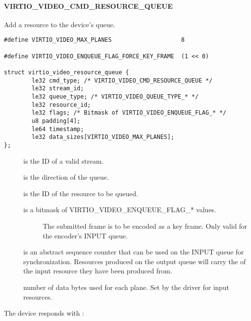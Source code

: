 \paragraph{VIRTIO_VIDEO_CMD_RESOURCE_QUEUE}\label{sec:Device Types / Video Device / Device Operation / Device Operation: Resource Commands / VIRTIO_VIDEO_CMD_RESOURCE_QUEUE}

Add a resource to the device's queue.

\begin{lstlisting}
#define VIRTIO_VIDEO_MAX_PLANES                    8

#define VIRTIO_VIDEO_ENQUEUE_FLAG_FORCE_KEY_FRAME  (1 << 0)

struct virtio_video_resource_queue {
        le32 cmd_type; /* VIRTIO_VIDEO_CMD_RESOURCE_QUEUE */
        le32 stream_id;
        le32 queue_type; /* VIRTIO_VIDEO_QUEUE_TYPE_* */
        le32 resource_id;
        le32 flags; /* Bitmask of VIRTIO_VIDEO_ENQUEUE_FLAG_* */
        u8 padding[4];
        le64 timestamp;
        le32 data_sizes[VIRTIO_VIDEO_MAX_PLANES];
};
\end{lstlisting}

\begin{description}
\item[]
is the ID of a valid stream.
\item[]
is the direction of the queue.
\item[]
is the ID of the resource to be queued.
\item[]
is a bitmask of VIRTIO\_VIDEO\_ENQUEUE\_FLAG\_* values.

\begin{description}
\item[]
The submitted frame is to be encoded as a key frame. Only valid for the
encoder's INPUT queue.
\end{description}
\item[]
is an abstract sequence counter that can be used on the INPUT queue for
synchronization. Resources produced on the output queue will carry the
 of the input resource they have been produced from.
\item[]
number of data bytes used for each plane. Set by the driver for input
resources.
\end{description}

The device responds with
:

